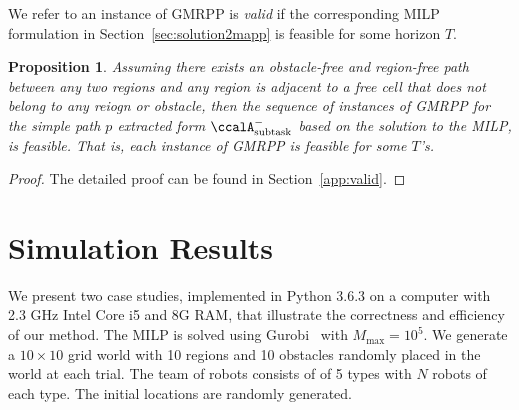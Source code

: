 \documentclass[Afour,sageh,times]{sagej}
\newtheorem{prop}[thm]{Proposition}
\newcommand{\auto}[1]{\ccalA_{\textup{#1}}}
\begin{document}
{{We refer to an instance of GMRPP is {\it valid} if the corresponding MILP formulation in Section~\ref{sec:solution2mapp} is feasible for some horizon $T$.
 \begin{prop}\label{prop:valid}
   Assuming there exists an obstacle-free and region-free path between any two regions and any region is adjacent to a free cell that does not belong to any reiogn or obstacle, then the sequence of instances of GMRPP  for the simple path $p$ extracted form $\auto{subtask}^-$ based on the solution to the MILP, is feasible. That is, each instance of GMRPP is feasible for some $T$'s.
\end{prop}
 \begin{proof}
     The detailed proof can be found in Section~\ref{app:valid}.
 \end{proof}
\section{Simulation Results}\label{sec:sim}
We present two case studies, implemented in Python 3.6.3 on a computer with 2.3 GHz Intel Core i5 and 8G RAM, that illustrate the correctness and efficiency of our method. The MILP is solved using Gurobi~\cite{gurobi} with $M_{\text{max}}=10^5$. We generate a  $10\times 10$ grid world with 10 regions and 10 obstacles randomly placed in the world at each trial. The team of robots consists of of 5 types with $N$ robots of each type. The initial locations are randomly generated.

}}
\end{document}
